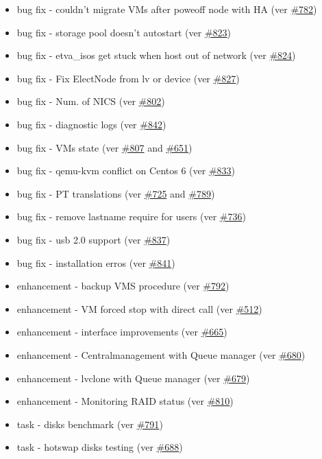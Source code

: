 \begin{itemize}
	\item bug fix - couldn't migrate VMs after poweoff node with HA (ver \href{https://srcmaster.eurotux.com/pm/p/etva/ticket/782}{\#782})
	\item bug fix - storage pool doesn't autostart (ver \href{https://srcmaster.eurotux.com/pm/p/etva/ticket/823}{\#823})
	\item bug fix - etva\_isos get stuck when host out of network (ver \href{https://srcmaster.eurotux.com/pm/p/etva/ticket/824}{\#824})
	\item bug fix - Fix ElectNode from lv or device (ver \href{https://srcmaster.eurotux.com/pm/p/etva/ticket/827}{\#827})
	\item bug fix - Num. of NICS (ver \href{https://srcmaster.eurotux.com/pm/p/etva/ticket/802}{\#802})
	\item bug fix - diagnostic logs (ver \href{https://srcmaster.eurotux.com/pm/p/etva/ticket/842}{\#842})
	\item bug fix - VMs state (ver \href{https://srcmaster.eurotux.com/pm/p/etva/ticket/807}{\#807} and \href{https://srcmaster.eurotux.com/pm/p/etva/ticket/651}{\#651})
	\item bug fix - qemu-kvm conflict on Centos 6 (ver \href{https://srcmaster.eurotux.com/pm/p/etva/ticket/833}{\#833})
	\item bug fix - PT translations (ver \href{https://srcmaster.eurotux.com/pm/p/etva/ticket/725}{\#725} and \href{https://srcmaster.eurotux.com/pm/p/etva/ticket/789}{\#789})
	\item bug fix - remove lastname require for users (ver \href{https://srcmaster.eurotux.com/pm/p/etva/ticket/736}{\#736})
	\item bug fix - usb 2.0 support (ver \href{https://srcmaster.eurotux.com/pm/p/etva/ticket/837}{\#837})
	\item bug fix - installation erros (ver \href{https://srcmaster.eurotux.com/pm/p/etva/ticket/841}{\#841})
	\item enhancement - backup VMS procedure (ver \href{https://srcmaster.eurotux.com/pm/p/etva/ticket/792}{\#792})
	\item enhancement - VM forced stop with direct call (ver \href{https://srcmaster.eurotux.com/pm/p/etva/ticket/512}{\#512})
	\item enhancement - interface improvements (ver \href{https://srcmaster.eurotux.com/pm/p/etva/ticket/665}{\#665})
	\item enhancement - Centralmanagement with Queue manager (ver \href{https://srcmaster.eurotux.com/pm/p/etva/ticket/680}{\#680})
	\item enhancement - lvclone with Queue manager (ver \href{https://srcmaster.eurotux.com/pm/p/etva/ticket/679}{\#679})
	\item enhancement - Monitoring RAID status (ver \href{https://srcmaster.eurotux.com/pm/p/etva/ticket/810}{\#810})
	\item task - disks benchmark (ver \href{https://srcmaster.eurotux.com/pm/p/etva/ticket/791}{\#791})
	\item task - hotswap disks testing (ver \href{https://srcmaster.eurotux.com/pm/p/etva/ticket/688}{\#688})
\end{itemize}


